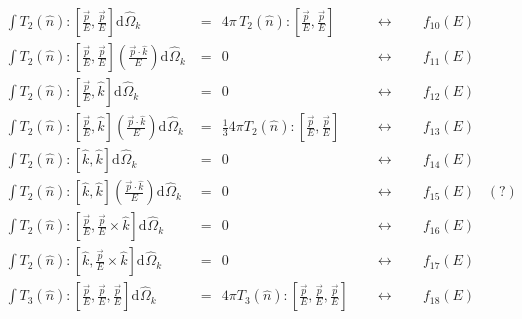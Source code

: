 \begin{eqnarray}
\int T_2(\hat{n}): \!\! \left[\frac{\vec{p}}{E}, \frac{\vec{p}}{E} \right]  \textrm{d}^{}_{}\hat{\Omega}_k &= \:\: 4\pi \, T_2(\hat{n}): \!\! \left[\frac{\vec{p}}{E}, \frac{\vec{p}}{E} \right]
\;\;\;\;\;\;\;  &\leftrightarrow \;\;\;\;\;\;\; f_{10}(E)
\\
\int T_2(\hat{n}): \!\! \left[\frac{\vec{p}}{E}, \frac{\vec{p}}{E} \right]  \left( \frac{\vec{p}\cdot\hat{k} }{E} \right) \textrm{d}^{}_{}\hat{\Omega}_k &= \:\: 0
\;\;  \;\;\;\;\;\;\; \;\;\;\;\;\;\; \;\;\;\;\;\;\; \;\;\;\;\;\;\; \;&\leftrightarrow \;\;\;\;\;\;\; f_{11}(E)
\\
\int T_2(\hat{n}): \!\! \left[\frac{\vec{p}}{E}, \hat{k} \right]  \textrm{d}^{}_{}\hat{\Omega}_k &= \:\: 0
\;\;  \;\;\;\;\;\;\; \;\;\;\;\;\;\; \;\;\;\;\;\;\; \;\;\;\;\;\;\; \;&\leftrightarrow \;\;\;\;\;\;\; f_{12}(E)
\\
\int T_2(\hat{n}): \!\! \left[\frac{\vec{p}}{E}, \hat{k} \right] \left( \frac{\vec{p}\cdot\hat{k}}{E} \right) \textrm{d}^{}_{}\hat{\Omega}_k &= \:\: \frac{1}{3} 4\pi  T_2(\hat{n}): \!\! \left[\frac{\vec{p}}{E}, \frac{\vec{p}}{E} \right] 
\, \;\;\;\; &\leftrightarrow \;\;\;\;\;\;\; f_{13}(E)
\\
\int T_2(\hat{n}): \!\! \left[\hat{k}, \hat{k} \right]  \textrm{d}^{}_{}\hat{\Omega}_k &= \:\: 0
\;\;  \;\;\;\;\;\;\; \;\;\;\;\;\;\; \;\;\;\;\;\;\; \;\;\;\;\;\;\; \;&\leftrightarrow \;\;\;\;\;\;\; f_{14}(E)
\\
\int T_2(\hat{n}): \!\! \left[\hat{k}, \hat{k} \right] \left( \frac{\vec{p}\cdot\hat{k}}{E} \right) \textrm{d}^{}_{}\hat{\Omega}_k &= \:\: 0
\;\;  \;\;\;\;\;\;\; \;\;\;\;\;\;\; \;\;\;\;\;\;\; \;\;\;\;\;\;\; \;&\leftrightarrow \;\;\;\;\;\;\; f_{15}(E) \;\;\; (?)
\\
\int T_2(\hat{n}): \!\! \left[\frac{\vec{p}}{E}, \frac{\vec{p}}{E} \times \hat{k} \right]  \textrm{d}^{}_{}\hat{\Omega}_k &= \:\: 0
\;\;  \;\;\;\;\;\;\; \;\;\;\;\;\;\; \;\;\;\;\;\;\; \;\;\;\;\;\;\; \;&\leftrightarrow \;\;\;\;\;\;\; f_{16}(E)
\\
\int T_2(\hat{n}): \!\! \left[\hat{k}, \frac{\vec{p}}{E} \times \hat{k} \right]  \textrm{d}^{}_{}\hat{\Omega}_k &= \:\: 0
\;\;  \;\;\;\;\;\;\; \;\;\;\;\;\;\; \;\;\;\;\;\;\; \;\;\;\;\;\;\; \;&\leftrightarrow \;\;\;\;\;\;\; f_{17}(E)
\\
\int T_3(\hat{n}): \!\! \left[\frac{\vec{p}}{E}, \frac{\vec{p}}{E}, \frac{\vec{p}}{E} \right]  \textrm{d}^{}_{}\hat{\Omega}_k &= \:\: 4 \pi  T_3(\hat{n}): \!\! \left[\frac{\vec{p}}{E}, \frac{\vec{p}}{E}, \frac{\vec{p}}{E} \right] 
\;\, \;&\leftrightarrow \;\;\;\;\;\;\; f_{18}(E)
\end{eqnarray}







